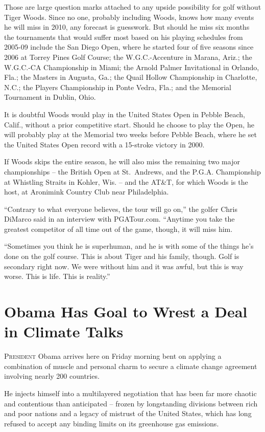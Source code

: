 ﻿\documentclass[12pt]{article}
\begin{document}
Those are large question marks attached to any upside possibility for golf without Tiger Woods.
Since no one, probably including Woods, knows how many events he will miss in 2010, any forecast is
guesswork. But should he miss six months the tournaments that would suffer most based on his playing
schedules from 2005-09 include the San Diego Open, where he started four of five seasons since 2006
at Torrey Pines Golf Course; the W.G.C.-Accenture in Marana, Ariz.; the W.G.C.-CA Championship in
Miami; the Arnold Palmer Invitational in Orlando, Fla.; the Masters in Augusta, Ga.; the Quail
Hollow Championship in Charlotte, N.C.; the Players Championship in Ponte Vedra, Fla.; and the
Memorial Tournament in Dublin, Ohio.

It is doubtful Woods would play in the United States Open in Pebble Beach, Calif., without a prior
competitive start. Should he choose to play the Open, he will probably play at the Memorial two
weeks before Pebble Beach, where he set the United States Open record with a 15-stroke victory in
2000.

If Woods skips the entire season, he will also miss the remaining two major championships -- the
British Open at St.~Andrews, and the P.G.A. Championship at Whistling Straits in Kohler, Wis. -- and
the AT\&T, for which Woods is the host, at Aronimink Country Club near Philadelphia.

``Contrary to what everyone believes, the tour will go on,'' the golfer Chris DiMarco said in an
interview with PGATour.com. ``Anytime you take the greatest competitor of all time out of the game,
though, it will miss him.

``Sometimes you think he is superhuman, and he is with some of the things he's done on the golf
course. This is about Tiger and his family, though. Golf is secondary right now. We were without him
and it was awful, but this is way worse. This is life. This is reality.''

\section{Obama Has Goal to Wrest a Deal in Climate Talks}

\lettrine{P}{resident} Obama arrives here on Friday morning bent on applying
a combination of muscle and personal charm to secure a climate change agreement involving nearly 200
countries.

He injects himself into a multilayered negotiation that has been far more chaotic and contentious
than anticipated -- frozen by longstanding divisions between rich and poor nations and a legacy of
mistrust of the United States, which has long refused to accept any binding limits on its greenhouse
gas emissions.
\end{document}
